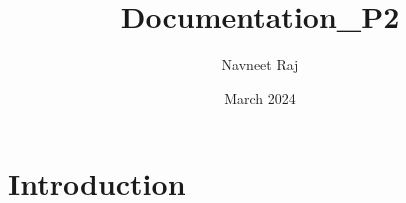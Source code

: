 \documentclass{article}
\title{Documentation_P2}
\author{Navneet Raj}
\date{March 2024}
\begin{document}
\maketitle

\section{Introduction}
\end{document}
